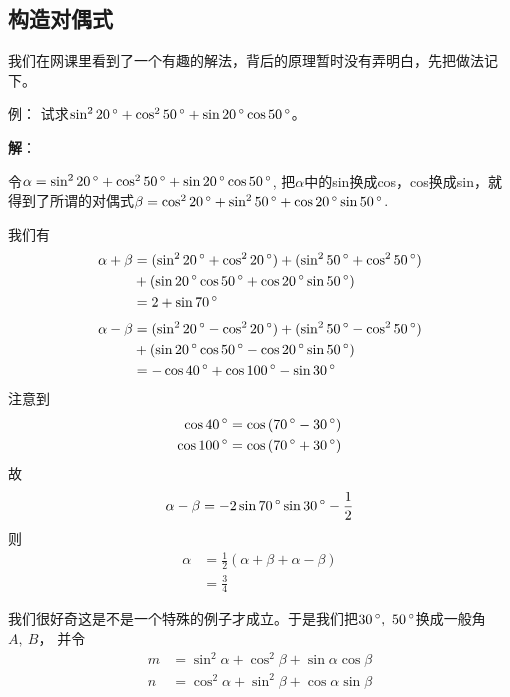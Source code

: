 \subsection{构造对偶式}
我们在网课里看到了一个有趣的解法，背后的原理暂时没有弄明白，先把做法记下。

例：
试求\(\sin^2{20\,^{\circ}} + \cos^2{50\,^{\circ}} + 
\sin{20\,^{\circ}}\cos{50\,^{\circ}}\)。

\textbf{解}：

令\(\alpha = \sin^2{20\,^{\circ}} + \cos^2{50\,^{\circ}} + 
\sin{20\,^{\circ}}\cos{50\,^{\circ}}\), 把\(\alpha\)中的sin换成cos，cos换成sin，就
得到了所谓的对偶式\(\beta = \cos^2{20\,^{\circ}} + \sin^2{50\,^{\circ}} + 
\cos{20\,^{\circ}}\sin{50\,^{\circ}}\).

我们有
\begin{align}
\alpha + \beta
&= (\sin^2{20\,^{\circ}} + \cos^2{20\,^{\circ}}) + (\sin^2{50\,^{\circ}} + 
\cos^2{50\,^{\circ}}) \nonumber \\
&+ (\sin{20\,^{\circ}}\cos{50\,^{\circ}} + 
\cos{20\,^{\circ}}\sin{50\,^{\circ}}) \nonumber \\
&= 2 + \sin{70\,^{\circ}}
\end{align}
\begin{align}
\alpha - \beta
&= (\sin^2{20\,^{\circ}} - \cos^2{20\,^{\circ}}) + (\sin^2{50\,^{\circ}} - 
\cos^2{50\,^{\circ}}) \nonumber \\
&+ (\sin{20\,^{\circ}}\cos{50\,^{\circ}} - 
\cos{20\,^{\circ}}\sin{50\,^{\circ}}) \nonumber \\
&= -\cos{40\,^{\circ}} + \cos{100\,^{\circ}} - 
\sin{30\,^{\circ}}
\end{align}
注意到
\begin{align*}
\cos{40\,^{\circ}} = \cos{(70\,^{\circ}- 30\,^{\circ})}\\
\cos{100\,^{\circ}} = \cos{(70\,^{\circ}+ 30\,^{\circ})}
\end{align*}
故
\begin{equation}
\alpha - \beta = -2\sin{70\,^{\circ}}\sin{30\,^{\circ}} - \frac{1}{2}
\end{equation}
则
\begin{align}
\alpha
&= \frac{1}{2}(\alpha + \beta + \alpha - \beta) \nonumber \\
&= \frac{3}{4}
\end{align}

我们很好奇这是不是一个特殊的例子才成立。于是我们把\(30\mdeg,\ 50\mdeg\)换成一般角\(A,\ B\)，
并令
\begin{align*}
m &= \sin^2{\alpha} + \cos^2{\beta} + \sin{\alpha}\cos{\beta} \\
n &= \cos^2{\alpha} + \sin^2{\beta} + \cos{\alpha}\sin{\beta}
\end{align*}

